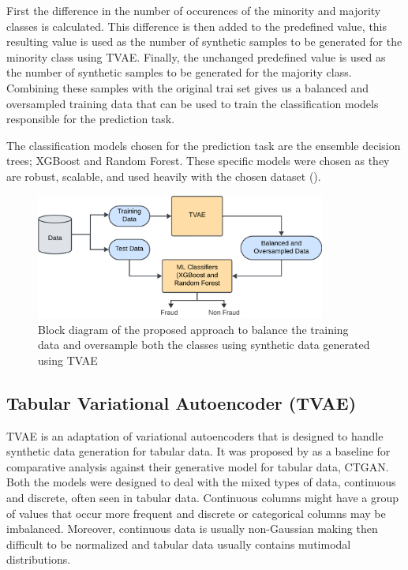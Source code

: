 \documentclass[twoside,11pt]{article}
\begin{document}
First the difference in the number of occurences of the minority and majority classes is calculated. This difference is then added to the predefined value, this resulting value is used as the number of synthetic samples to be generated for the minority class using TVAE. Finally, the unchanged predefined value is used as the number of synthetic samples to be generated for the majority class. Combining these samples with the original trai set gives us a balanced and oversampled training data that can be used to train the classification models responsible for the prediction task. 

The classification models chosen for the prediction task are the ensemble decision trees; XGBoost and Random Forest. These specific models were chosen as they are robust, scalable, and used heavily with the chosen dataset (\cite{schrijverAutomobileInsuranceFraud2024, Salmi2022, aiemsuwanNovelHybridMethod2024, owolabiAutoInsuranceFraudDetection2024}). 

\begin{figure}
  \centering
  \includegraphics[width=0.85\textwidth]{images/model_tvae.png}
  \caption{Block diagram of the proposed approach to balance the training data and oversample both the classes using synthetic data generated using TVAE}
  \label{fig:model}
\end{figure}

\subsection{Tabular Variational Autoencoder (TVAE)}
TVAE is an adaptation of variational autoencoders that is designed to handle synthetic data generation for tabular data. It was proposed by \cite{XuRp} as a baseline for comparative analysis against their generative model for tabular data, CTGAN. Both the models were designed to deal with the mixed types of data, continuous and discrete, often seen in tabular data. Continuous columns might have a group of values that occur more frequent and discrete or categorical columns may be imbalanced. Moreover, continuous data is usually non-Gaussian making then difficult to be normalized and tabular data usually contains mutimodal distributions. 
\end{document}

